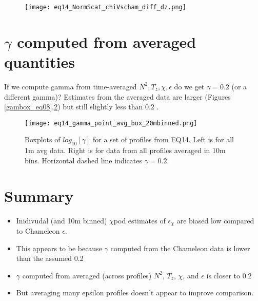 \documentclass[11pt]{article}
\begin{document}
\begin{figure}[htbp]
\texttt{[image: eq14\_NormScat\_chiVscham\_diff\_dz.png]}
\caption{}
\label{}
\end{figure}



%







\clearpage
\section{$\gamma$ computed from averaged quantities}

If we compute gamma from time-averaged $N^2,T_z,\chi,\epsilon$ do we get $\gamma=0.2$ (or a different gamma)? Estimates from the averaged data are larger (Figures \ref{gambox_eq08},\ref{gambox_eq14}) but still slightly less than 0.2 .

\begin{figure}[htbp]
\texttt{[image: eq14\_gamma\_point\_avg\_box\_20mbinned.png]}
\caption{Boxplots of $log_{10}[\gamma]$ for a set of profiles from EQ14. Left is for all 1m avg data. Right is for data from all profiles averaged in 10m bins. Horizontal dashed line indicates $\gamma=0.2$.}
\label{gambox_eq14}
\end{figure}



\clearpage
\section{Summary}

\begin{itemize}

\item Inidivudal (and 10m binned) $\chi$pod estimates of $\epsilon_{\chi}$ are biased low compared to Chameleon $\epsilon$.

\item This appears to be because $\gamma$ computed from the Chameleon data is lower than the assumed 0.2

\item $\gamma$ computed from averaged (across profiles) $N^2$, $T_z$, $\chi$, and $\epsilon$ is closer to 0.2

\item But averaging many epsilon profiles doesn't appear to improve comparison.

\end{itemize}
\end{document}
